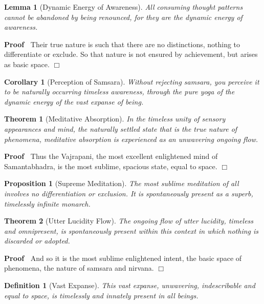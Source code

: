\documentclass{article}
\newenvironment{proof}{\noindent\textbf{Proof\ }}{\hspace*{\fill}$\Box$\medskip}
\newtheorem{corollary}{Corollary}
\newtheorem{definition}{Definition}
\newtheorem{lemma}{Lemma}
\newtheorem{proposition}{Proposition}
{\theorembodyfont{\rmfamily}\newtheorem{remark}{Remark}}
\newtheorem{theorem}{Theorem}
\begin{document}
\begin{lemma}
  [Dynamic Energy of Awareness] All consuming thought patterns cannot be
  abandoned by being renounced, for they are the dynamic energy of awareness.
\end{lemma}

\begin{proof}
  Their true nature is such that there are no distinctions, nothing to
  differentiate or exclude. So that nature is not ensured by achievement, but
  arises as basic space.
\end{proof}

\begin{corollary}
  [Perception of Samsara] Without rejecting samsara, you perceive it to be
  naturally occurring timeless awareness, through the pure yoga of the dynamic
  energy of the vast expanse of being.
\end{corollary}

\begin{theorem}
  [Meditative Absorption] In the timeless unity of sensory appearances and
  mind, the naturally settled state that is the true nature of phenomena,
  meditative absorption is experienced as an unwavering ongoing flow.
\end{theorem}

\begin{proof}
  Thus the Vajrapani, the most excellent enlightened mind of Samantabhadra, is
  the most sublime, spacious state, equal to space.
\end{proof}

\begin{proposition}
  [Supreme Meditation] The most sublime meditation of all involves no
  differentiation or exclusion. It is spontaneously present as a superb,
  timelessly infinite monarch.
\end{proposition}

\begin{theorem}
  [Utter Lucidity Flow] The ongoing flow of utter lucidity, timeless and
  omnipresent, is spontaneously present within this context in which nothing
  is discarded or adopted.
\end{theorem}

\begin{proof}
  And so it is the most sublime enlightened intent, the basic space of
  phenomena, the nature of samsara and nirvana.
\end{proof}

\begin{definition}
  [Vast Expanse] This vast expanse, unwavering, indescribable and equal to
  space, is timelessly and innately present in all beings.
\end{definition}
\end{document}
